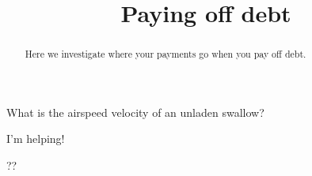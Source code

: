 \documentclass{ximera}
\title{Paying off debt}
\begin{document}
\begin{abstract}
Here we investigate where your payments go when you pay off debt.
\end{abstract}
\maketitle

\begin{question}
What is the airspeed velocity of an unladen swallow?
\begin{solution}
\begin{hint}
I'm helping!
\end{hint}
\begin{freeResponse}
??
\end{freeResponse}
\end{solution}
\end{question}
\end{document}
